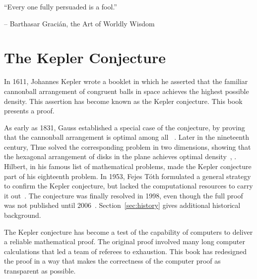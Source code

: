 {

\narrower\parindent=0pt
\baselineskip

{\it

``Every one fully persuaded is a fool.''

{\hfill\rm-- Barthasar Graci\'an, the Art of Worldly Wisdom~\cite{Gracian}} %

}

{

\it



}

}



\newpage

\section*{The Kepler Conjecture}

In 1611, Johannes Kepler wrote a booklet in which he asserted that the familiar
cannonball arrangement of congruent balls in space achieves the
highest possible density.  This assertion has become known as the
Kepler conjecture.  This book presents a proof.

As early as 1831, Gauss established a special case of the conjecture,
by proving that the cannonball arrangement is optimal among all
~\cite{Gau31}.  Later in the nineteenth century,
Thue solved the corresponding problem in two dimensions, showing that
the hexagonal arrangement of disks in the plane achieves optimal
density~\cite{Thu92}, \cite{Thu10}.  Hilbert, in his famous list of
mathematical problems, made the Kepler conjecture part of his eighteenth
problem.  In 1953, Fejes T\'oth formulated a general strategy to
confirm the Kepler conjecture, but lacked the computational resources
to carry it out~\cite{Fej53}.  The conjecture was finally resolved in
1998, even though the full proof was not published until
2006~\cite{Hales:2006:DCG}.  Section~\ref{sec:history} gives
additional historical background.

The Kepler conjecture has become a test of the capability of computers to
deliver a reliable mathematical proof.  The original proof 
involved many long computer calculations that
led a team of referees to exhaustion.  This book has
 redesigned the proof in a way that makes the correctness of
the computer proof as transparent as possible.


